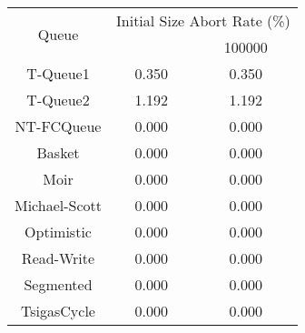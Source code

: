\begin{tabular}{|c|c|c|}
\hline
\multirow{2}{*}{Queue} & \multicolumn{2}{c|}{Initial Size Abort Rate (\%)}\\\cline{2-3}& \qquad 10000 \qquad\quad & 100000\\
\hline
\hline
T-Queue1 & 0.350 & 0.350\\
T-Queue2 & 1.192 & 1.192\\
NT-FCQueue & 0.000 & 0.000\\
Basket & 0.000 & 0.000\\
Moir & 0.000 & 0.000\\
Michael-Scott & 0.000 & 0.000\\
Optimistic & 0.000 & 0.000\\
Read-Write & 0.000 & 0.000\\
Segmented & 0.000 & 0.000\\
TsigasCycle & 0.000 & 0.000\\
\hline\end{tabular}
